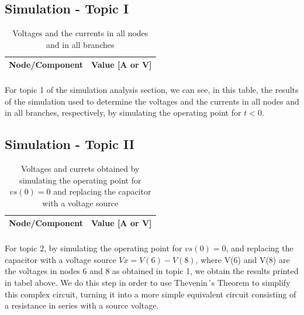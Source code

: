 \subsection{Simulation - Topic I}
\label{subsec:sim_first}

\begin{table}[H] \centering
  \begin{tabular}{|l|r|}
    \hline    
    {\bf Node/Component} & {\bf Value [A or V]} \\ \hline
    
  \end{tabular}
  \caption*{Voltages and the currents in all nodes and in all branches}
 \label{tab:op1}
\end{table}

\paragraph{}
For topic 1 of the simulation analysis section, we can see, in this table, the results of the simulation used to determine the voltages and the currents in all nodes and in all branches, respectively, by simulating the operating point for $t<0$.

\subsection{Simulation - Topic II}
\label{subsec:sim_second}

\begin{table}[H] \centering
  \begin{tabular}{|l|r|}
    \hline    
    {\bf Node/Component} & {\bf Value [A or V]} \\ \hline
    
  \end{tabular}
  \caption*{Voltages and currets obtained by simulating the operating point for $vs(0)=0$ and replacing the capacitor with a voltage source}
 \label{tab:op1}
\end{table}

\paragraph{}
For topic 2, by simulating the operating point for $vs(0)=0$, and replacing the capacitor with a voltage source $Vx = V(6)-V(8)$, where V(6) and V(8) are the voltages in nodes 6 and 8 as obtained in topic 1, we obtain the results printed in tabel above. We do this step in order to use Thevenin´s Theorem to simplify this complex circuit, turning it into a more simple equivalent circuit consisting of a resistance in series with a source voltage.

